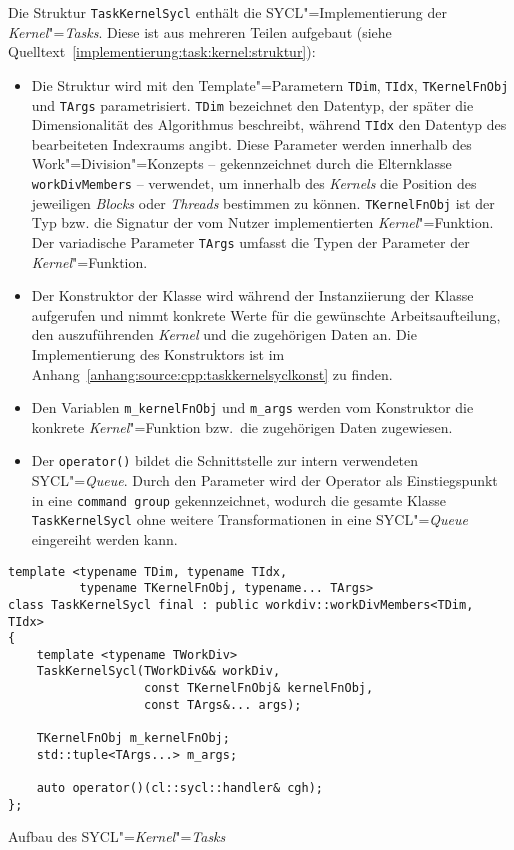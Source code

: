 Die Struktur \texttt{TaskKernelSycl} enthält die SYCL"=Implementierung der
\textit{Kernel}"=\textit{Tasks}. Diese ist aus mehreren Teilen aufgebaut (siehe
Quelltext~\ref{implementierung:task:kernel:struktur}):

\begin{itemize}
    \item Die Struktur wird mit den Template"=Parametern \texttt{TDim},
          \texttt{TIdx}, \texttt{TKernelFnObj} und \texttt{TArgs}
          parametrisiert. \texttt{TDim} bezeichnet den Datentyp, der später die
          Dimensionalität des Algorithmus beschreibt, während \texttt{TIdx} den
          Datentyp des bearbeiteten Indexraums angibt. Diese Parameter werden
          innerhalb des Work"=Division"=Konzepts -- gekennzeichnet durch die
          Elternklasse \texttt{workDivMembers} -- verwendet, um innerhalb des
          \textit{Kernels} die Position des jeweiligen \textit{Blocks} oder
          \textit{Threads} bestimmen zu können. \texttt{TKernelFnObj} ist der Typ
          bzw. die Signatur der vom Nutzer implementierten
          \textit{Kernel}"=Funktion. Der variadische Parameter \texttt{TArgs}
          umfasst die Typen der Parameter der \textit{Kernel}"=Funktion.
    \item Der Konstruktor der Klasse wird während der Instanziierung der Klasse
          aufgerufen und nimmt konkrete Werte für die gewünschte
          Arbeitsaufteilung, den auszuführenden \textit{Kernel} und die
          zugehörigen Daten an. Die Implementierung des Konstruktors ist im
          Anhang~\ref{anhang:source:cpp:taskkernelsyclkonst} zu finden.
    \item Den Variablen \texttt{m\_kernelFnObj} und \texttt{m\_args} werden vom
          Konstruktor die konkrete \textit{Kernel}"=Funktion bzw.\ die
          zugehörigen Daten zugewiesen.
    \item Der \texttt{operator()} bildet die Schnittstelle zur intern
          verwendeten SYCL"=\textit{Queue}. Durch den Parameter wird der
          Operator als Einstiegspunkt in eine \texttt{command group}
          gekennzeichnet, wodurch die gesamte Klasse \texttt{TaskKernelSycl}
          ohne weitere Transformationen in eine SYCL"=\textit{Queue} eingereiht
          werden kann.
\end{itemize}

\begin{code}
    \begin{verbatim}
template <typename TDim, typename TIdx,
          typename TKernelFnObj, typename... TArgs>
class TaskKernelSycl final : public workdiv::workDivMembers<TDim, TIdx>
{
    template <typename TWorkDiv>
    TaskKernelSycl(TWorkDiv&& workDiv,
                   const TKernelFnObj& kernelFnObj,
                   const TArgs&... args);

    TKernelFnObj m_kernelFnObj;
    std::tuple<TArgs...> m_args;

    auto operator()(cl::sycl::handler& cgh);
};
    \end{verbatim}
    \caption{Aufbau des SYCL"=\textit{Kernel}"=\textit{Tasks}}
    \label{implementierung:task:kernel:struktur}
\end{code}

